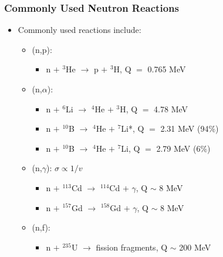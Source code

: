 \subsubsection{Commonly Used Neutron Reactions}
\begin{itemize}
    \item Commonly used reactions include:
    \begin{itemize}
        \item (n,p):
        \begin{itemize}
            \item[] n $+$ $^3$He $\rightarrow$ p $+$ $^3$H, Q $=$ 0.765 MeV
        \end{itemize}
        \item (n,$\alpha$):
        \begin{itemize}
            \item[] n $+$ $^6$Li $\rightarrow$ $^4$He $+$ $^3$H, Q $=$ 4.78 MeV
            \item[] n $+$ $^{10}$B $\rightarrow$ $^{4}$He $+$ $^7$Li*, Q $=$ 2.31 MeV (94\%)
            \item[] n $+$ $^{10}$B $\rightarrow$ $^{4}$He $+$ $^7$Li, Q $=$ 2.79 MeV (6\%)
        \end{itemize}
        \item (n,$\gamma$): $\sigma\propto1/v$
        \begin{itemize}
            \item[] n $+$ $^{113}$Cd $\rightarrow$ $^{114}$Cd $+$ $\gamma$, Q $\sim$ 8 MeV
            \item[] n $+$ $^{157}$Gd $\rightarrow$ $^{158}$Gd $+$ $\gamma$, Q $\sim$ 8 MeV
        \end{itemize}
        \item (n,f):
        \begin{itemize}
            \item[] n $+$ $^{235}$U $\rightarrow$ fission fragments, Q $\sim$ 200 MeV
        \end{itemize}
    \end{itemize}
\end{itemize}

